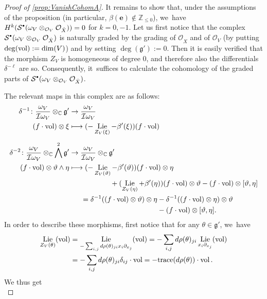 \documentclass[JEP,XML,SOM,Unicode,published]{cedram}
\let\mathds\mathbb
\newcommand\mto{\mathchoice{\longmapsto}{\mapsto}{\mapsto}{\mapsto}}
\newcommand{\sbullet}{{\scriptscriptstyle\bullet}}
\newcommand{\csbullet}{{\raisebox{1pt}{$\sbullet$}}}
\newcommand{\bme}{{\boldsymbol{e}}}
\newcommand{\dC}{{\mathds C}}\let\C\dC
\newcommand{\dZ}{{\mathds Z}}\let\mbz\dZ\let\Z\dZ
\newcommand{\cI}{\mathcal{I}}
\newcommand{\cO}{\mathcal{O}}\let\O\cO
\newcommand{\cS}{\mathcal{S}}
\newcommand{\frg}{\mathfrak{g}}
\DeclareMathOperator{\Lie}{\textup{Lie}}
\DeclareMathOperator{\vol}{\textup{vol}}
\begin{document}
\begin{proof}[Proof of \cref{prop:VanishCohomA}]
It remains to show that, under the assumptions of the pro\-position (in particular, $\beta(\bme)\notin \dZ_{\leq 0}$), we~have $H^k(\cS^{\csbullet}(\omega_V\otimes_{\cO_V} \cO_{\hat{X}}))=0$ for $k=0,-1$. Let us first notice that the complex $\cS^{\csbullet}(\omega_V\otimes_{\cO_V}\cO_{\hat{X}})$
is naturally graded by the grading of $\cO_{\hat{X}}$ and of $\cO_V$ (by putting $\deg(\vol):=\dim(V)$) and by setting $\deg(\frg'):=0$.
Then it is easily verified that the morphism $Z_V$ is homogeneous of degree $0$, and therefore also the differentials $\delta^{-\ell}$ are so. Consequently, it~suffices to calculate the cohomology of the graded parts of $\cS^{\csbullet}(\omega_V\otimes_{\cO_V}\cO_{\hat{X}})$.

The relevant maps in this complex are as follows:
\begin{align*}
\delta^{-1} \colon \frac{\omega_V}{\cI\omega_V}\otimes_\dC \frg'
&\to
\frac{\omega_V}{\cI\omega_V}
\\
(f\cdot \vol)\otimes \xi & \mto (-\Lie_{Z_V(\xi)}-\beta'(\xi))(f\cdot \vol)
\\[5pt]
\delta^{-2} \colon \frac{\omega_V}{\cI\omega_V}\otimes_\dC \bigwedge^2 \frg'
&\to
\frac{\omega_V}{\cI\omega_V}\otimes_\dC \frg'
\\
(f\cdot \vol)\otimes\vartheta\wedge\eta &\mto
(-\Lie_{Z_V(\vartheta)}-\beta'(\vartheta))(f\cdot \vol)\otimes \eta
\\
&
\hspace*{2cm}+(\Lie_{Z_V(\eta)}+\beta'(\eta))(f\cdot \vol)\otimes \vartheta -(f\cdot \vol)\otimes[\vartheta,\eta] \\
&\hphantom{\mto}=
\delta^{-1}((f\cdot\vol)\otimes\vartheta)\otimes\eta - \delta^{-1}((f\cdot\vol)\otimes\eta)\otimes\vartheta\\
&
\hphantom{{} \mto =\delta^{-1}((f\cdot\vol)\otimes\vartheta)\otimes\eta}-(f\cdot \vol)\otimes[\vartheta,\eta].
\end{align*}
In order to describe these morphisms, first notice that for any $\theta\in\frg'$, we~have
\begin{align*}
\Lie_{Z_V(\theta)}(\vol)& =
\Lie_{-\sum_{i,j}d\rho(\theta)_{ji}x_i\partial_{x_j}}(\vol)=
-\sum_{i,j}d\rho(\theta)_{ji}\Lie_{x_i\partial_{x_j}}(\vol)\\
&=
-\sum_{i,j}d\rho(\theta)_{ji}\delta_{ij} \cdot \vol=
-\textup{trace}(d\rho(\theta)) \cdot \vol.
\end{align*}
We thus get
\begin{equation}\label{eq:CancelLieVolTrace}

\end{equation}
\end{proof}
\end{document}
